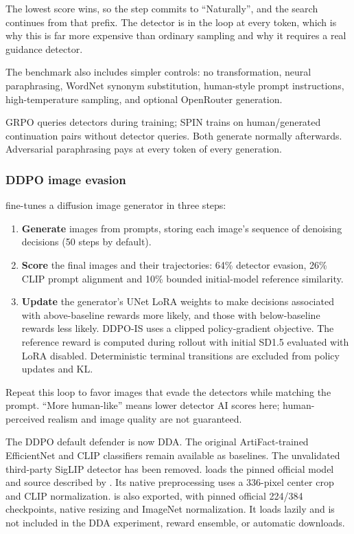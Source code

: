 The lowest score wins, so the step commits to ``Naturally'', and the
search continues from that prefix. The detector is in the loop at every
token, which is why this is far more expensive than ordinary sampling
and why it requires a real guidance detector.

The benchmark also includes simpler controls: no transformation, neural
paraphrasing, WordNet synonym substitution, human-style prompt
instructions, high-temperature sampling, and optional OpenRouter
generation.

GRPO queries detectors during training; SPIN trains on human/generated
continuation pairs without detector queries. Both generate normally
afterwards. Adversarial paraphrasing pays at every token of every
generation.

\subsubsection{DDPO image
evasion}\label{record-docs-research-guide-md-ddpo-image-evasion}

\texttt{} fine-tunes a diffusion image
generator in three steps:

\begin{enumerate}
\def\labelenumi{\arabic{enumi}.}
\tightlist
\item
  \textbf{Generate} images from prompts, storing each image's sequence
  of denoising decisions (50 steps by default).
\item
  \textbf{Score} the final images and their trajectories: 64\% detector
  evasion, 26\% CLIP prompt alignment and 10\% bounded initial-model
  reference similarity.
\item
  \textbf{Update} the generator's UNet LoRA weights to make decisions
  associated with above-baseline rewards more likely, and those with
  below-baseline rewards less likely. DDPO-IS uses a clipped
  policy-gradient objective. The reference reward is computed during
  rollout with initial SD1.5 evaluated with LoRA disabled. Deterministic
  terminal transitions are excluded from policy updates and KL.
\end{enumerate}

Repeat this loop to favor images that evade the detectors while matching
the prompt. ``More human-like'' means lower detector AI scores here;
human-perceived realism and image quality are not guaranteed.

The DDPO default defender is now DDA. The original ArtiFact-trained
EfficientNet and CLIP classifiers remain available as baselines. The
unvalidated third-party SigLIP detector has been removed.
\texttt{} loads the pinned official model and
source described by
\texttt{}.
Its native preprocessing uses a 336-pixel center crop and CLIP
normalization. \texttt{} is also
exported, with pinned official 224/384 checkpoints, native resizing and
ImageNet normalization. It loads lazily and is not included in the DDA
experiment, reward ensemble, or automatic downloads.

